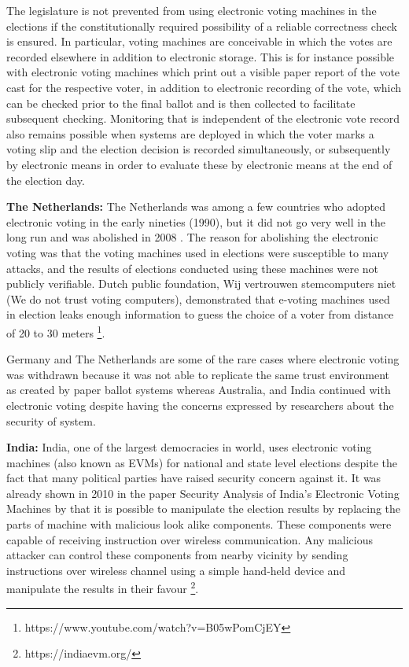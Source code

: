   \begin{displayquote}
  The legislature is not prevented from using electronic voting machines 
  in the elections if the constitutionally required possibility of a 
  reliable correctness check is ensured. In particular, voting machines 
  are conceivable in which the votes are recorded elsewhere in addition
   to electronic storage. This is for instance possible with electronic
   voting machines which print out a visible paper report of the vote 
   cast for the respective voter, in addition to electronic recording 
   of the vote, which can be checked prior to the final ballot and is
    then collected to facilitate subsequent checking. Monitoring that is
     independent of the electronic vote record also remains possible when
     systems are deployed in which the voter marks a voting slip and the 
     election decision is recorded simultaneously, 
     or subsequently by electronic means in 
     order to evaluate these by electronic means at the end of the 
     election day.
     \end{displayquote}
  
  \textbf{The Netherlands:}
  The Netherlands was among a few countries who adopted electronic voting 
  in the early nineties (1990), but it did not go very well in the long 
  run and was abolished in 2008 \citep{Jacobs2009}. 
  The reason for abolishing the electronic voting was that   
  the voting machines used in elections were susceptible to many attacks,
  and the results of elections conducted using these machines 
  were not publicly verifiable.  Dutch public foundation, Wij vertrouwen stemcomputers niet
  (We do not trust voting computers), demonstrated that e-voting machines 
  used in election leaks enough information to guess the choice of a voter 
  from distance of 20 to 30 meters  \footnote{https://www.youtube.com/watch?v=B05wPomCjEY}.
  
  
  Germany and The Netherlands are some of the rare cases where 
  electronic voting was withdrawn because it was not able to 
  replicate the same trust environment as created by paper 
  ballot systems whereas Australia, and India continued 
  with electronic voting despite having the concerns expressed 
  by researchers about the security of system. 
  
  \textbf{India:}
  India, one of the largest democracies in world, 
  uses electronic voting machines (also known as EVMs) for national 
  and state level  elections despite the fact that many political parties have raised security 
  concern against it. It was already shown in 2010 in the paper 
  Security Analysis of India's Electronic Voting Machines by 
  \citep{Wolchok:2010:SAI:1866307.1866309}  that it 
  is possible to manipulate the election results by replacing the 
  parts of machine with malicious look alike components. These components 
  were capable of receiving instruction over wireless communication. Any malicious 
  attacker can control these components from nearby vicinity by sending 
  instructions over wireless channel using a simple hand-held device and 
  manipulate the results in their favour \footnote{https://indiaevm.org/}.
  

